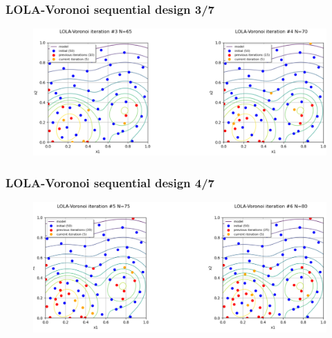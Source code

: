 \documentclass[aspectratio=169]{beamer}
\begin{document}

\begin{frame}
\frametitle{LOLA-Voronoi sequential design 3/7}

\begin{figure}
   \includegraphics[width=1.04\textwidth]{figures/lolavoronoi_2}
\end{figure}

\end{frame}


\begin{frame}
\frametitle{LOLA-Voronoi sequential design 4/7}

\begin{figure}
   \includegraphics[width=1.04\textwidth]{figures/lolavoronoi_3}
\end{figure}

\end{frame}

\end{document}
